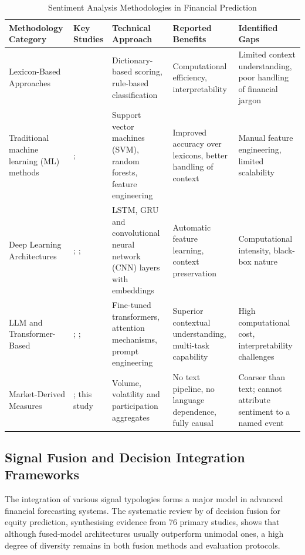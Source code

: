 \begin{table}[!ht]
\centering
\caption{Sentiment Analysis Methodologies in Financial Prediction}
\label{tab:sentiment_methodologies}
\footnotesize
\begin{tabular}{p{1.9cm}p{2.0cm}p{2.1cm}p{2.0cm}p{2.0cm}}
\hline
\textbf{Methodology Category} & \textbf{Key Studies} & \textbf{Technical Approach} & \textbf{Reported Benefits} & \textbf{Identified Gaps} \\
\hline
Lexicon-Based Approaches & \citet{loughran11} & Dictionary-based scoring, rule-based classification & Computational efficiency, interpretability & Limited context understanding, poor handling of financial jargon \\
\hline
Traditional machine learning (ML) methods & \citet{vargas22}; \citet{wang24} & Support vector machines (SVM), random forests, feature engineering & Improved accuracy over lexicons, better handling of context & Manual feature engineering, limited scalability \\
\hline
Deep Learning Architectures & \citet{mu23}; \citet{bacco24}; \citet{tai22} & LSTM, GRU and convolutional neural network (CNN) layers with embeddings & Automatic feature learning, context preservation & Computational intensity, black-box nature \\
\hline
LLM and Transformer-Based & \citet{jung24}; \citet{liu24}; \citet{onozo24} & Fine-tuned transformers, attention mechanisms, prompt engineering & Superior contextual understanding, multi-task capability & High computational cost, interpretability challenges \\
\hline
Market-Derived Measures & \citet{bakerwurgler07}; this study & Volume, volatility and participation aggregates & No text pipeline, no language dependence, fully causal & Coarser than text; cannot attribute sentiment to a named event \\
\hline
\end{tabular}
\end{table}

\subsection{Signal Fusion and Decision Integration Frameworks}

The integration of various signal typologies forms a major model in advanced financial
forecasting systems. The systematic review by \citet{zhang22} of decision fusion for
equity prediction, synthesising evidence from 76 primary studies, shows that although
fused-model architectures usually outperform unimodal ones, a high degree of diversity
remains in both fusion methods and evaluation protocols.

